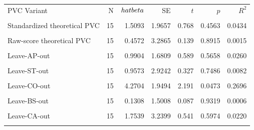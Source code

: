 \begin{tabular}{lrrrrrr}
\hline
PVC Variant & N & $\\hat{\\beta}$ & SE & $t$ & $p$ & $R^2$ \\\\
\hline
Standardized theoretical PVC & 15 & 1.5093 & 1.9657 & 0.768 & 0.4563 & 0.0434 \\\\
Raw-score theoretical PVC & 15 & 0.4572 & 3.2865 & 0.139 & 0.8915 & 0.0015 \\\\
Leave-AP-out & 15 & 0.9904 & 1.6809 & 0.589 & 0.5658 & 0.0260 \\\\
Leave-ST-out & 15 & 0.9573 & 2.9242 & 0.327 & 0.7486 & 0.0082 \\\\
Leave-CO-out & 15 & 4.2704 & 1.9494 & 2.191 & 0.0473 & 0.2696 \\\\
Leave-BS-out & 15 & 0.1308 & 1.5008 & 0.087 & 0.9319 & 0.0006 \\\\
Leave-CA-out & 15 & 1.7539 & 3.2399 & 0.541 & 0.5974 & 0.0220 \\\\
\hline
\end{tabular}